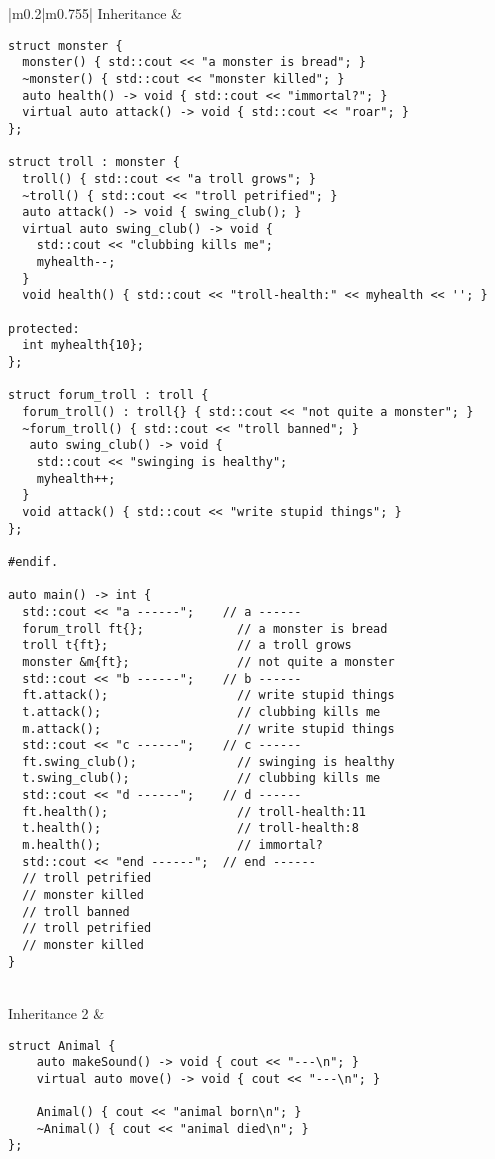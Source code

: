 \documentclass[main.tex,fontsize=8pt,paper=a4,paper=portrait,DIV=calc]{scrartcl}
\begin{document}
\pagebreak
\begin{table}[ht!]
\begin{tabular}{|m{0.2\linewidth}|m{0.755\linewidth}|}
\hline
Inheritance & 
\begin{lstlisting}
struct monster {
  monster() { std::cout << "a monster is bread"; }
  ~monster() { std::cout << "monster killed"; }
  auto health() -> void { std::cout << "immortal?"; }
  virtual auto attack() -> void { std::cout << "roar"; }
};

struct troll : monster {
  troll() { std::cout << "a troll grows"; }
  ~troll() { std::cout << "troll petrified"; }
  auto attack() -> void { swing_club(); }
  virtual auto swing_club() -> void {
    std::cout << "clubbing kills me";
    myhealth--;
  }
  void health() { std::cout << "troll-health:" << myhealth << ''; }

protected:
  int myhealth{10};
};

struct forum_troll : troll {
  forum_troll() : troll{} { std::cout << "not quite a monster"; }
  ~forum_troll() { std::cout << "troll banned"; }
   auto swing_club() -> void {
    std::cout << "swinging is healthy";
    myhealth++;
  }
  void attack() { std::cout << "write stupid things"; }
};

#endif.

auto main() -> int {
  std::cout << "a ------";    // a ------
  forum_troll ft{};             // a monster is bread
  troll t{ft};                  // a troll grows
  monster &m{ft};               // not quite a monster
  std::cout << "b ------";    // b ------
  ft.attack();                  // write stupid things
  t.attack();                   // clubbing kills me
  m.attack();                   // write stupid things
  std::cout << "c ------";    // c ------
  ft.swing_club();              // swinging is healthy
  t.swing_club();               // clubbing kills me
  std::cout << "d ------";    // d ------
  ft.health();                  // troll-health:11
  t.health();                   // troll-health:8
  m.health();                   // immortal?
  std::cout << "end ------";  // end ------
  // troll petrified
  // monster killed
  // troll banned
  // troll petrified
  // monster killed
}
\end{lstlisting}
\\
\hline
Inheritance 2 & 
\begin{lstlisting}
struct Animal {
    auto makeSound() -> void { cout << "---\n"; }
    virtual auto move() -> void { cout << "---\n"; }

    Animal() { cout << "animal born\n"; }
    ~Animal() { cout << "animal died\n"; }
};


\end{lstlisting}
\end{tabular}
\end{table}
\end{document}

